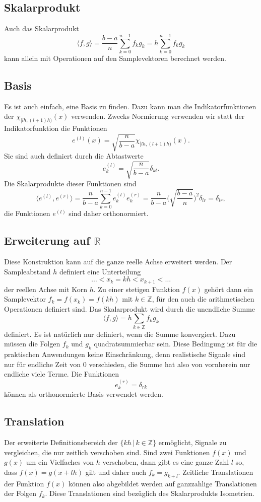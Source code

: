 \subsection{Skalarprodukt
\label{haar:subsection:skalarprodukt}}
Auch das Skalarprodukt 
\[
\langle f,g\rangle
=
\frac{b-a}{n}
\sum_{k=0}^{n-1} f_k g_k
=
h
\sum_{k=0}^{n-1} f_k g_k
\]
kann allein mit Operationen auf den Samplevektoren berechnet werden.

\subsection{Basis
\label{haar:subsection:basis}}
Es ist auch einfach, eine Basis zu finden.
Dazu kann man die Indikatorfunktionen der $\chi_{[lh,(l+1)h)}(x)$
verwenden.
Zwecks Normierung verwenden wir statt der Indikatorfunktion die
Funktionen
\[
e^{(l)}(x) = \sqrt{\frac{n}{b-a}}\chi_{[lh,(l+1)h)}(x).
\]
Sie sind auch definiert durch die Abtastwerte
\[
e_k^{(l)} = \sqrt{\frac{n}{b-a}}\delta_{kl}.
\]
Die Skalarprodukte dieser Funktionen sind
\[
\langle e^{(l)}, e^{(r)}\rangle
=
\frac{n}{b-a}
\sum_{k=0}^{n-1} e^{(l)}_k e^{(r)}_k
=
\frac{n}{b-a}
\biggl(\sqrt{\frac{b-a}{n}}\biggr)^2 \delta_{lr}
=
\delta_{lr},
\]
die Funktionen $e^{(l)}$ sind daher orthonormiert.

\subsection{Erweiterung auf $\mathbb R$}
Diese Konstruktion kann auf die ganze reelle Achse erweitert werden.
Der Sampleabstand $h$ definiert eine Unterteilung
\[
\dots < x_{k} = kh < x_{k+1} < \dots
\]
der reellen Achse mit Korn $h$.
Zu einer stetigen Funktion $f(x)$ gehört dann ein Samplevektor
$f_k=f(x_k)=f(kh)$ mit $k\in\mathbb Z$, für den auch die
arithmetischen Operationen definiert sind.
Das Skalarprodukt wird durch die unendliche Summe
\[
\langle f, g\rangle
=
h
\sum_{k\in\mathbb Z} f_k g_k
\]
definiert.
Es ist natürlich nur definiert, wenn die Summe konvergiert.
Dazu müssen die Folgen $f_k$ und $g_k$ quadratsummierbar sein.
Diese Bedingung ist für die praktischen Anwendungen keine Einschränkung,
denn realistische Signale sind nur für endliche Zeit von $0$ verschieden,
die Summe hat also von vornherein nur endliche viele Terme.
Die Funktionen
\[
e^{(r)}_k = \delta_{rk}
\]
können als orthonormierte Basis verwendet werden.

\subsection{Translation
\label{haar:subsection:translation}}
Der erweiterte Definitionsbereich der $\{kh\,|\,k\in\mathbb Z\}$ ermöglicht,
Signale zu vergleichen, die nur zeitlich verschoben sind.
Sind zwei Funktionen $f(x)$ und $g(x)$ um ein Vielfaches von $h$ verschoben,
dann gibt es eine ganze Zahl $l$ so, dass $f(x)=g(x+lh)$ gilt und daher auch
$f_k = g_{k+l}$.
Zeitliche Translationen der Funktion $f(x)$ können also abgebildet
werden auf ganzzahlige Translationen der Folgen $f_k$.
Diese Translationen sind bezüglich des Skalarprodukts Isometrien.

